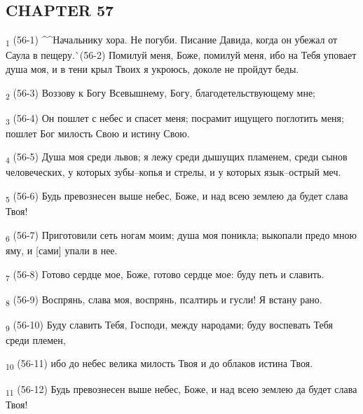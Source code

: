 \subsection{CHAPTER 57}
\begin{tcolorbox}
\textsubscript{1} (56-1) ^^Начальнику хора. Не погуби. Писание Давида, когда он убежал от Саула в пещеру.^^ (56-2) Помилуй меня, Боже, помилуй меня, ибо на Тебя уповает душа моя, и в тени крыл Твоих я укроюсь, доколе не пройдут беды.
\end{tcolorbox}
\begin{tcolorbox}
\textsubscript{2} (56-3) Воззову к Богу Всевышнему, Богу, благодетельствующему мне;
\end{tcolorbox}
\begin{tcolorbox}
\textsubscript{3} (56-4) Он пошлет с небес и спасет меня; посрамит ищущего поглотить меня; пошлет Бог милость Свою и истину Свою.
\end{tcolorbox}
\begin{tcolorbox}
\textsubscript{4} (56-5) Душа моя среди львов; я лежу среди дышущих пламенем, среди сынов человеческих, у которых зубы--копья и стрелы, и у которых язык--острый меч.
\end{tcolorbox}
\begin{tcolorbox}
\textsubscript{5} (56-6) Будь превознесен выше небес, Боже, и над всею землею да будет слава Твоя!
\end{tcolorbox}
\begin{tcolorbox}
\textsubscript{6} (56-7) Приготовили сеть ногам моим; душа моя поникла; выкопали предо мною яму, и [сами] упали в нее.
\end{tcolorbox}
\begin{tcolorbox}
\textsubscript{7} (56-8) Готово сердце мое, Боже, готово сердце мое: буду петь и славить.
\end{tcolorbox}
\begin{tcolorbox}
\textsubscript{8} (56-9) Воспрянь, слава моя, воспрянь, псалтирь и гусли! Я встану рано.
\end{tcolorbox}
\begin{tcolorbox}
\textsubscript{9} (56-10) Буду славить Тебя, Господи, между народами; буду воспевать Тебя среди племен,
\end{tcolorbox}
\begin{tcolorbox}
\textsubscript{10} (56-11) ибо до небес велика милость Твоя и до облаков истина Твоя.
\end{tcolorbox}
\begin{tcolorbox}
\textsubscript{11} (56-12) Будь превознесен выше небес, Боже, и над всею землею да будет слава Твоя!
\end{tcolorbox}
